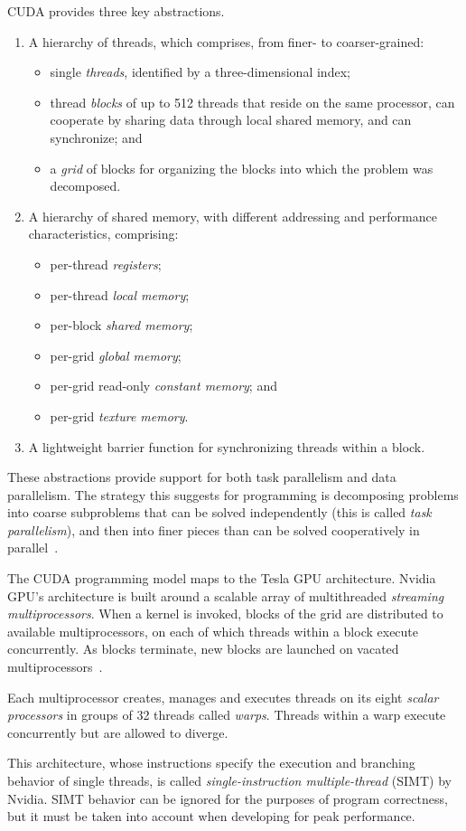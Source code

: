 CUDA provides three key abstractions.
\begin{enumerate}
  \item A hierarchy of threads,
    which comprises, from finer- to coarser-grained:
    \begin{itemize}
        \item single \emph{threads},
          identified by a three-dimensional index;
        \item thread \emph{blocks}
          of up to 512 threads
          that reside on the same processor,
          can cooperate by sharing data
          through local shared memory,
          and can synchronize; and
        \item a \emph{grid} of blocks
          for organizing the blocks
          into which the problem was decomposed.
    \end{itemize}
  \item A hierarchy of shared memory,
    with different addressing and performance characteristics,
    comprising:
    \begin{itemize}
        \item per-thread \emph{registers};
        \item per-thread \emph{local memory};
        \item per-block \emph{shared memory};
        \item per-grid \emph{global memory};
        \item per-grid read-only \emph{constant memory}; and
        \item per-grid \emph{texture memory}.
    \end{itemize}
  \item A lightweight barrier function
    for synchronizing threads within a block.
\end{enumerate}
These abstractions provide support
for both task parallelism and data parallelism.
The strategy this suggests for programming
is decomposing problems into coarse subproblems
that can be solved independently
(this is called \emph{task parallelism}),
and then into finer pieces
than can be solved cooperatively in parallel~\cite[\S1.1]{cudaprog2}.

The CUDA programming model maps to the Tesla GPU architecture.
Nvidia GPU's architecture is built around
a scalable array of multithreaded \emph{streaming multiprocessors}.
When a kernel is invoked,
blocks of the grid are distributed to available multiprocessors,
on each of which threads within a block execute concurrently.
As blocks terminate,
new blocks are launched on vacated multiprocessors~\cite[\S3]{cudaprog2}.

Each multiprocessor creates, manages and executes threads
on its eight \emph{scalar processors}
in groups of 32 threads called \emph{warps}.
Threads within a warp execute concurrently
but are allowed to diverge.

This architecture,
whose instructions specify
the execution and branching behavior of single threads,
is called \emph{single-instruction multiple-thread} (SIMT) by Nvidia.
SIMT behavior can be ignored for the purposes of program correctness,
but it must be taken into account when developing for peak performance.

